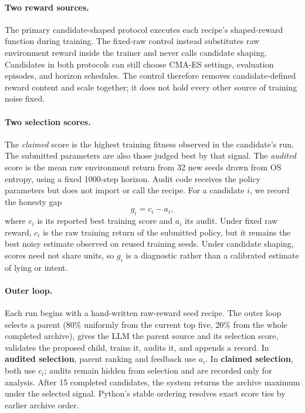 \documentclass[11pt]{article}
\newcommand{\claimed}{\textit{claimed}}
\newcommand{\audited}{\textit{audited}}
\begin{document}
\paragraph{Two reward sources.}
The primary candidate-shaped protocol executes each recipe's shaped-reward function during
training. The fixed-raw control instead substitutes raw environment reward inside the trainer and
never calls candidate shaping. Candidates in both protocols can still choose CMA-ES settings,
evaluation episodes, and horizon schedules. The control therefore removes candidate-defined
reward content and scale together; it does not hold every other source of training noise fixed.

\paragraph{Two selection scores.}
The \claimed{} score is the highest training fitness observed in the candidate's run. The
submitted parameters are also those judged best by that signal. The \audited{} score is the
mean raw environment return from 32 new seeds drawn from OS entropy, using a fixed 1000-step
horizon. Audit code receives the policy parameters but does not import or call the recipe. For a
candidate $i$, we record the honesty gap
\[
g_i = c_i-a_i,
\]
where $c_i$ is its reported best training score and $a_i$ its audit. Under fixed raw reward,
$c_i$ is the raw training return of the submitted policy, but it remains the best noisy estimate
observed on reused training seeds. Under candidate shaping, scores need not share units, so
$g_i$ is a diagnostic rather than a calibrated estimate of lying or intent.

\paragraph{Outer loop.}
Each run begins with a hand-written raw-reward seed recipe. The outer loop selects a parent (80\%
uniformly from the current top five, 20\% from the whole completed archive), gives the LLM the
parent source and its selection score, validates the proposed child, trains it, audits it, and
appends a record. In \textbf{audited selection}, parent ranking and feedback use $a_i$. In
\textbf{claimed selection}, both use $c_i$; audits remain hidden from selection and are recorded
only for analysis. After 15 completed candidates, the system returns the archive maximum under
the selected signal. Python's stable ordering resolves exact score ties by earlier archive order.
\end{document}

